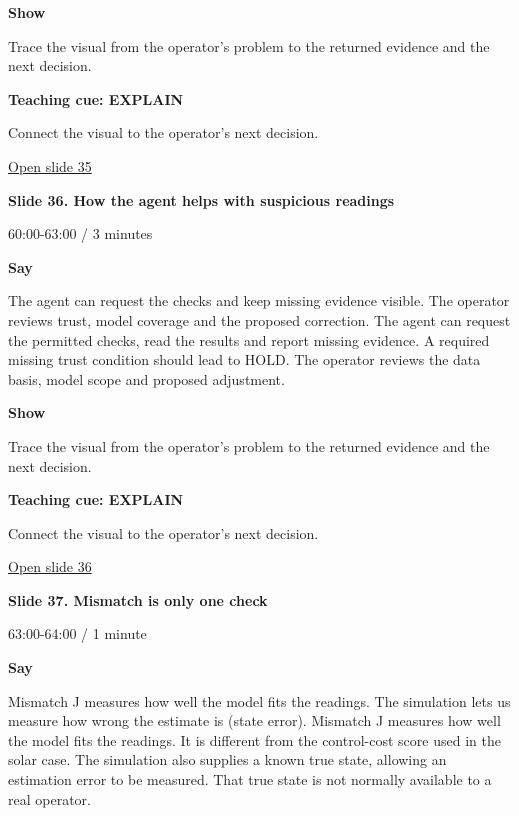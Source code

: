 \documentclass[12pt,letterpaper]{article}
\begin{document}
\textbf{Show}\par Trace the visual from the operator's problem to the returned evidence and the next decision.\par\medskip
\textbf{Teaching cue: EXPLAIN}\par Connect the visual to the operator's next decision.\par\medskip
\vfill\href{https://alaaselim-sudo.github.io/GridGuard-Agentic-AI-Tutorials/operator-cases/#/35}{Open slide 35}\par
\clearpage{}
{\Large\bfseries\color{IEEEBlue} Slide 36. How the agent helps with suspicious readings\par}\medskip
{\small\color{Slate} 60:00-63:00 /\allowbreak{} 3 minutes\par}\medskip
\textbf{Say}\par The agent can request the checks and keep missing evidence visible. The operator reviews trust, model coverage and the proposed correction. The agent can request the permitted checks, read the results and report missing evidence. A required missing trust condition should lead to HOLD. The operator reviews the data basis, model scope and proposed adjustment.\par\medskip
\textbf{Show}\par Trace the visual from the operator's problem to the returned evidence and the next decision.\par\medskip
\textbf{Teaching cue: EXPLAIN}\par Connect the visual to the operator's next decision.\par\medskip
\vfill\href{https://alaaselim-sudo.github.io/GridGuard-Agentic-AI-Tutorials/operator-cases/#/36}{Open slide 36}\par
\clearpage{}
{\Large\bfseries\color{IEEEBlue} Slide 37. Mismatch is only one check\par}\medskip
{\small\color{Slate} 63:00-64:00 /\allowbreak{} 1 minute\par}\medskip
\textbf{Say}\par Mismatch J measures how well the model fits the readings. The simulation lets us measure how wrong the estimate is (state error). Mismatch J measures how well the model fits the readings. It is different from the control-cost score used in the solar case. The simulation also supplies a known true state, allowing an estimation error to be measured. That true state is not normally available to a real operator.\par\medskip
\end{document}
